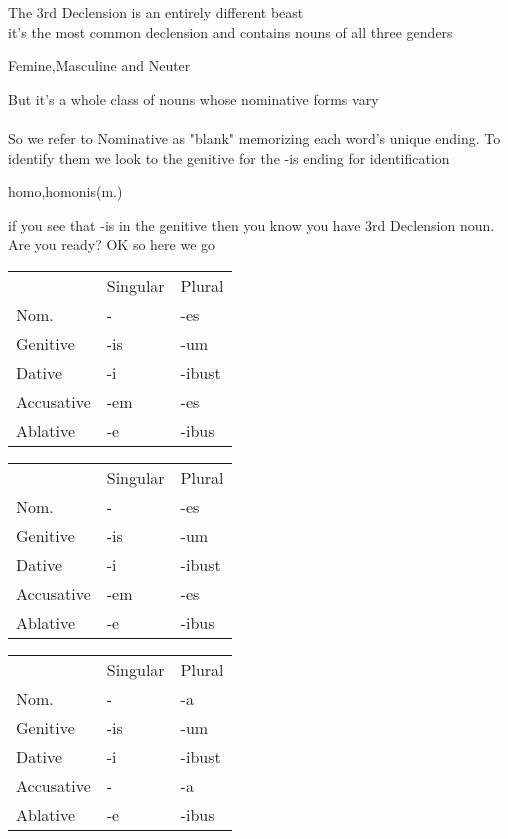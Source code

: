 The 3rd Declension is an entirely different beast\\ 
it's the most common declension and contains nouns of all
three genders
\begin{center}
  Femine,Masculine and Neuter 
\end{center}
But it's a whole class of nouns whose nominative forms vary \\ \\ 
So we refer to Nominative as "blank" memorizing each word's 
unique ending. To identify them we look to the genitive for the
-is ending for identification 
\begin{center}
  \large homo,homonis(m.)  
\end{center}
if you see that -is in the genitive then you know you have 3rd
Declension noun. Are you ready? OK so here we go
\begin{center}
  \begin{tabular}{lll}
    & Singular & Plural  \\
    Nom. & - & -es  \\ 
    Genitive & -is & -um \\
    Dative & -i & -ibust \\ 
    Accusative & -em & -es \\ 
    Ablative & -e & -ibus \\
  \end{tabular} 
\end{center}
\begin{center}
  \begin{tabular}{lll}
    & Singular & Plural  \\
    Nom. & - & -es  \\ 
    Genitive & -is & -um \\
    Dative & -i & -ibust \\ 
    Accusative & -em & -es \\ 
    Ablative & -e & -ibus \\
  \end{tabular} 
\end{center}
\begin{center}
  \begin{tabular}{lll}
    & Singular & Plural  \\
    Nom. & - & -a  \\ 
    Genitive & -is & -um \\
    Dative & -i & -ibust \\ 
    Accusative & - & -a \\ 
    Ablative & -e & -ibus \\
  \end{tabular} 
\end{center}
